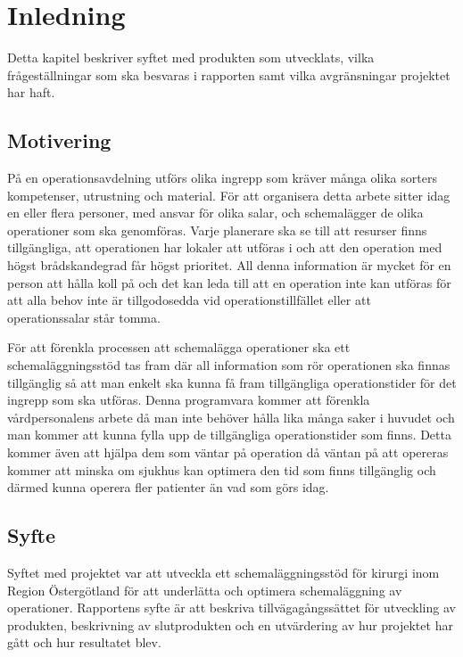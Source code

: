 \chapter{Inledning}
Detta kapitel beskriver syftet med produkten som utvecklats, vilka frågeställningar som ska besvaras i rapporten samt vilka avgränsningar projektet har haft.

\section{Motivering}
På en operationsavdelning utförs olika ingrepp som kräver många olika sorters kompetenser, utrustning och material. För att organisera detta arbete sitter
idag en eller flera personer, med ansvar för olika salar, och schemalägger de olika operationer som ska genomföras. Varje planerare ska se till att
resurser finns tillgängliga, att operationen har lokaler att utföras i och att den operation med högst brådskandegrad får högst prioritet. All denna information är
mycket för en person att hålla koll på och det kan leda till att en operation inte kan utföras för att alla behov inte är tillgodosedda vid operationstillfället
eller att operationssalar står tomma.

För att förenkla processen att schemalägga operationer ska ett schemaläggningsstöd tas fram där all information som rör operationen ska finnas
tillgänglig så att man enkelt ska kunna få fram tillgängliga operationstider för det ingrepp som ska utföras. Denna programvara kommer att förenkla
vårdpersonalens arbete då man inte behöver hålla lika många saker i huvudet och man kommer att kunna fylla upp de tillgängliga operationstider som finns.
Detta kommer även att hjälpa dem som väntar på operation då väntan på att opereras kommer att minska om sjukhus kan optimera den tid som finns tillgänglig och
därmed kunna operera fler patienter än vad som görs idag.

\section{Syfte}
Syftet med projektet var att utveckla ett schemaläggningsstöd för kirurgi inom Region Östergötland för att underlätta och optimera schemaläggning av operationer.
Rapportens syfte är att beskriva tillvägagångssättet för utveckling av produkten, beskrivning av slutprodukten och en utvärdering av hur projektet har gått och hur resultatet blev.

